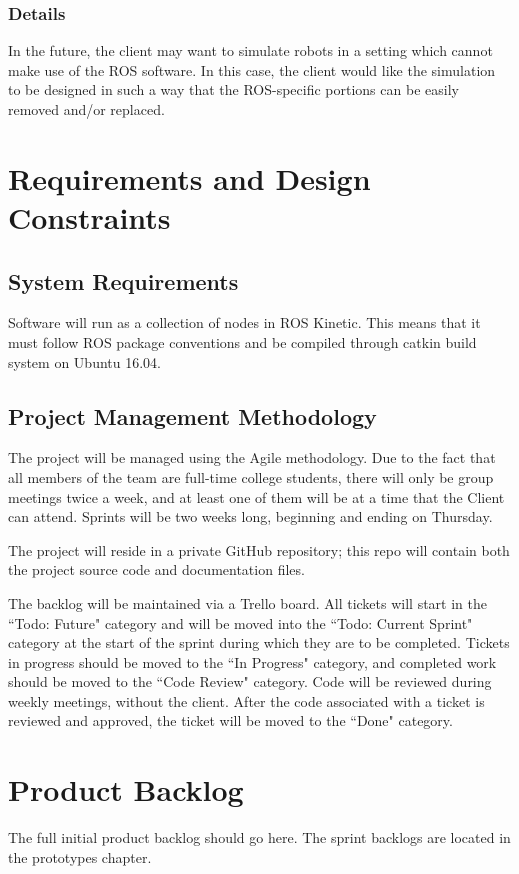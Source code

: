 \subsubsection{Details}
In the future, the client may want to simulate robots in a setting which cannot make use of the ROS software. In this case, the client would like the simulation to be designed in such a way that the ROS-specific portions can be easily removed and/or replaced.

\section{Requirements and Design Constraints}
\subsection{System  Requirements}
Software will run as a collection of nodes in ROS Kinetic. This means that it must follow ROS package conventions and be compiled through catkin build system on Ubuntu 16.04.

\subsection{Project  Management Methodology}
The project will be managed using the Agile methodology. Due to the fact that all members of the team are full-time college students, there will only be group meetings twice a week, and at least one of them will be at a time that the Client can attend. Sprints will be two weeks long, beginning and ending on Thursday.

The project will reside in a private GitHub repository; this repo will contain both the project source code and documentation files.

The backlog will be maintained via a Trello board. All tickets will start in the ``Todo: Future" category and will be moved into the ``Todo: Current Sprint" category at the start of the sprint during which they are to be completed. Tickets in progress should be moved to the ``In Progress" category, and completed work should be moved to the ``Code Review" category. Code will be reviewed during weekly meetings, without the client. After the code associated with a ticket is reviewed and approved, the ticket will be moved to the ``Done" category.

\section{Product Backlog}
The full initial product backlog should go here.  The sprint backlogs are located in the prototypes chapter.

